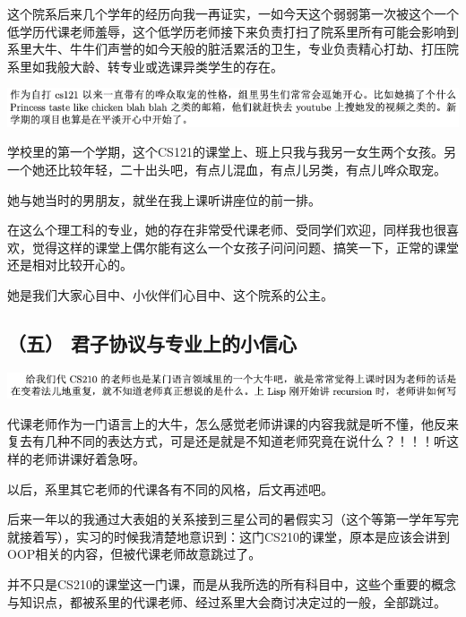 \documentclass[9pt, b5paper]{article}
\begin{document}
这个院系后来几个学年的经历向我一再证实，一如今天这个弱弱第一次被这个一个低学历代课老师羞辱，这个低学历老师接下来负责打扫了院系里所有可能会影响到系里大牛、牛牛们声誉的如今天般的脏活累活的卫生，专业负责精心打劫、打压院系里如我般大龄、转专业或选课异类学生的存在。


\begin{center}
\includegraphics[width=.9\linewidth]{./pic/backups_plans_20210424_160112.png}
\end{center}

学校里的第一个学期，这个CS121的课堂上、班上只我与我另一女生两个女孩。另一个她还比较年轻，二十出头吧，有点儿混血，有点儿另类，有点儿哗众取宠。

她与她当时的男朋友，就坐在我上课听讲座位的前一排。

在这么个理工科的专业，她的存在非常受代课老师、受同学们欢迎，同样我也很喜欢，觉得这样的课堂上偶尔能有这么一个女孩子问问问题、搞笑一下，正常的课堂还是相对比较开心的。 

她是我们大家心目中、小伙伴们心目中、这个院系的公主。 

\subsection{（五） 君子协议与专业上的小信心}
\label{sec:orgfe0272f}

\begin{center}
\includegraphics[width=.9\linewidth]{./pic/backups_plans_20210424_203858.png}
\end{center}

代课老师作为一门语言上的大牛，怎么感觉老师讲课的内容我就是听不懂，他反来复去有几种不同的表达方式，可是还是就是不知道老师究竟在说什么？！！！听这样的老师讲课好着急呀。 

以后，系里其它老师的代课各有不同的风格，后文再述吧。 

后来一年以的我通过大表姐的关系接到三星公司的暑假实习（这个等第一学年写完就接着写），实习的时候我清楚地意识到：这门CS210的课堂，原本是应该会讲到OOP相关的内容，但被代课老师故意跳过了。

并不只是CS210的课堂这一门课，而是从我所选的所有科目中，这些个重要的概念与知识点，都被系里的代课老师、经过系里大会商讨决定过的一般，全部跳过。
\end{document}
